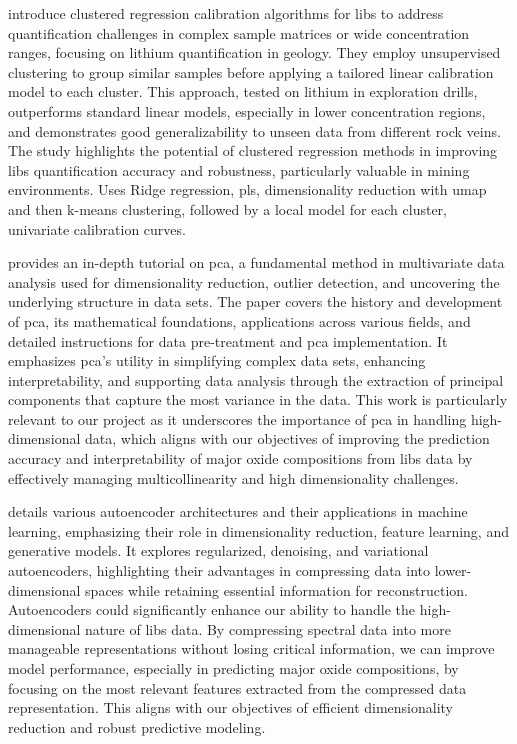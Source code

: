 \citet{silvaRobustCalibrationModels2022} introduce clustered regression calibration algorithms for \gls{libs} to address quantification challenges in complex sample matrices or wide concentration ranges, focusing on lithium quantification in geology.
They employ unsupervised clustering to group similar samples before applying a tailored linear calibration model to each cluster.
This approach, tested on lithium in exploration drills, outperforms standard linear models, especially in lower concentration regions, and demonstrates good generalizability to unseen data from different rock veins.
The study highlights the potential of clustered regression methods in improving \gls{libs} quantification accuracy and robustness, particularly valuable in mining environments.
Uses Ridge regression, \gls{pls}, dimensionality reduction with \gls{umap} and then k-means clustering, followed by a local model for each cluster, univariate calibration curves.

\citet{woldPrincipalComponentAnalysis1987} provides an in-depth tutorial on \gls{pca}, a fundamental method in multivariate data analysis used for dimensionality reduction, outlier detection, and uncovering the underlying structure in data sets.
The paper covers the history and development of \gls{pca}, its mathematical foundations, applications across various fields, and detailed instructions for data pre-treatment and \gls{pca} implementation.
It emphasizes \gls{pca}'s utility in simplifying complex data sets, enhancing interpretability, and supporting data analysis through the extraction of principal components that capture the most variance in the data.
This work is particularly relevant to our project as it underscores the importance of \gls{pca} in handling high-dimensional data, which aligns with our objectives of improving the prediction accuracy and interpretability of major oxide compositions from \gls{libs} data by effectively managing multicollinearity and high dimensionality challenges.

\citet{bankAutoencoders2021} details various autoencoder architectures and their applications in machine learning, emphasizing their role in dimensionality reduction, feature learning, and generative models.
It explores regularized, denoising, and variational autoencoders, highlighting their advantages in compressing data into lower-dimensional spaces while retaining essential information for reconstruction.
Autoencoders could significantly enhance our ability to handle the high-dimensional nature of \gls{libs} data.
By compressing spectral data into more manageable representations without losing critical information, we can improve model performance, especially in predicting major oxide compositions, by focusing on the most relevant features extracted from the compressed data representation.
This aligns with our objectives of efficient dimensionality reduction and robust predictive modeling.


